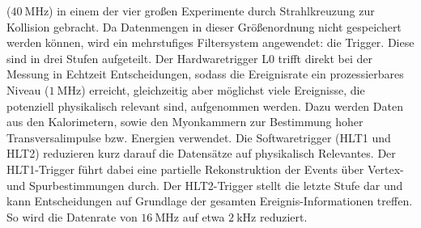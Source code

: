 ($\SI{40}{\mega\hertz}$) in einem der vier großen Experimente durch Strahlkreuzung zur Kollision gebracht. Da Datenmengen in dieser Größenordnung nicht gespeichert werden können, wird ein mehrstufiges Filtersystem angewendet: die Trigger. Diese sind in drei Stufen aufgeteilt. Der Hardwaretrigger \textsc{L0} trifft direkt bei der Messung in Echtzeit Entscheidungen, sodass die Ereignisrate ein prozessierbares Niveau ($\SI{1}{\mega\hertz}$) \cite{Tilburg} erreicht, gleichzeitig aber möglichst viele Ereignisse, die potenziell physikalisch relevant sind, aufgenommen werden. Dazu werden Daten aus den Kalorimetern, sowie den Myonkammern zur Bestimmung hoher Transversalimpulse bzw. Energien verwendet. Die Softwaretrigger (\textsc{HLT1} und \textsc{HLT2}) reduzieren kurz darauf die Datensätze auf physikalisch Relevantes. Der HLT1-Trigger führt dabei eine partielle Rekonstruktion der Events über Vertex- und Spurbestimmungen durch. Der HLT2-Trigger stellt die letzte Stufe dar und kann Entscheidungen auf Grundlage der gesamten Ereignis-Informationen treffen. So wird die Datenrate von $\SI{16}{\mega\hertz}$ auf etwa $\SI{2}{\kilo\hertz}$ reduziert.
%
